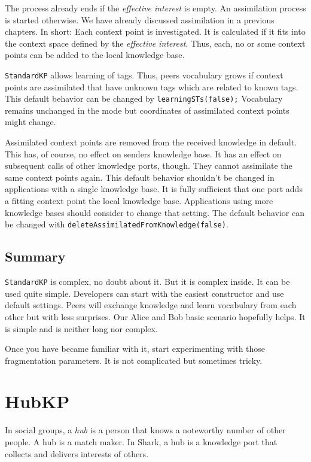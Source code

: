 {The process already ends if the {\it effective interest} is empty. An assimilation process is started otherwise. We have already discussed assimilation in a previous chapters. In short: Each context point is investigated. It is calculated if it fits into the context space defined by the {\it effective interest}. Thus, each, no or some context points can be added to the local knowledge base. 

{\tt StandardKP} allows learning of tags. Thus, peers vocabulary grows if context points are assimilated that have unknown tags which are related to known tags. This default behavior can be changed by {\tt learningSTs(false);} Vocabulary remains unchanged in the mode but coordinates of assimilated context points might change.

Assimilated context points are removed from the received knowledge in default. This has, of course, no effect on senders knowledge base. It has an effect on subsequent calls of other knowledge ports, though. They cannot assimilate the same context points again. This default behavior shouldn't be changed in applications with a single knowledge base. It is fully sufficient that one port adds a fitting context point the local knowledge base. Applications using more knowledge bases should consider to change that setting. The default behavior can be changed with {\tt deleteAssimilatedFromKnowledge(false)}.

\subsection{Summary}
{\tt StandardKP} is complex, no doubt about it. But it is complex inside. It can be used quite simple. Developers can start with the easiest constructor and use default settings. Peers will exchange knowledge and learn vocabulary from each other but with less surprises. Our Alice and Bob basic scenario hopefully helps.
It is simple and is neither long nor complex.

Once you have became familiar with it, start experimenting with those fragmentation parameters. It is not complicated but sometimes tricky.

\section{HubKP}
\label{sec:hubkp}
In social groups, a {\it hub} is a person that knows a noteworthy number of other people. A hub is a match maker. In Shark, a hub is a knowledge port that collects and delivers interests of others. 

}
